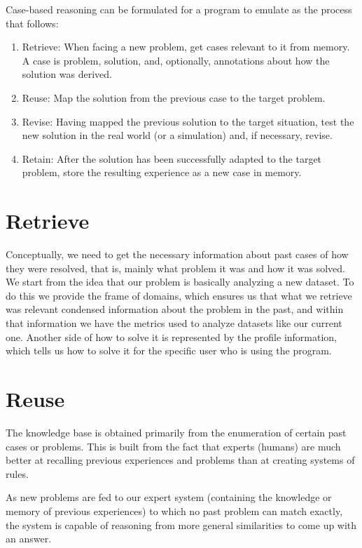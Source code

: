 Case-based reasoning can be formulated for a program to emulate as the process that follows:

\begin{enumerate}
\item Retrieve: When facing a new problem, get cases relevant to it from memory. A case is problem, solution, and, optionally, annotations about how the solution was derived. 
\item Reuse: Map the solution from the previous case to the target problem. 
\item Revise: Having mapped the previous solution to the target situation, test the new solution in the real world (or a simulation) and, if necessary, revise. 
\item Retain: After the solution has been successfully adapted to the target problem, store the resulting experience as a new case in memory. 
\end{enumerate}

\section{Retrieve}
\label{cap1:sec:retrieve}

Conceptually, we need to get the necessary information about past cases of how they were resolved, that is, mainly what problem it was and how it was solved.
We start from the idea that our problem is basically analyzing a new dataset.
To do this we provide the frame of domains, which ensures us that what we retrieve was relevant condensed information about the problem in the past, and within that information we have the metrics used to analyze datasets like our current one.
Another side of how to solve it is represented by the profile information, which tells us how to solve it for the specific user who is using the program.

\section{Reuse}
\label{cap1:sec:reuse}
The knowledge base is obtained primarily from the enumeration of certain past cases or problems. This is built from the fact that experts (humans) are much better at recalling previous experiences and problems than at creating systems of rules. 

As new problems are fed to our expert system (containing the knowledge or memory of previous experiences) to which no past problem can match exactly, the system is capable of reasoning from more general similarities to come up with an answer. 

